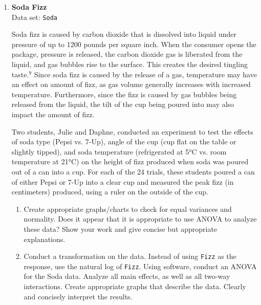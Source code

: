 \documentclass[
]{book}
\begin{document}
\begin{enumerate}
  \begin{enumerate}
    \item Make the assumption that ANOVA is appropriate for the data (i.e., do not transform any data). Using software, conduct an ANOVA for the data that will analyze all main effects, as well as all two-way interactions. Treat the six buildings as six levels of the \textit{Building} factor. Treat faucet, desk, and door as three levels of the \textit{Location} factor.
    \item Create appropriate graphs/charts to check for equal variances and normality. Does it appear that it is appropriate to use ANOVA to analyze these data?
    \item Transform the response to the natural log of \texttt{Count} and redo the analysis. How do the results change? Create appropriate graphs to display the main effects and the interaction effects. Describe how the academic buildings (ARH and Noyce) compare to the other buildings.
  \end{enumerate}

  \item \textbf{Soda Fizz}\\
  Data set: \texttt{Soda}

Soda fizz is caused by carbon dioxide that is dissolved into liquid under pressure of up to 1200 pounds per square inch. When the consumer opens the package, pressure is released, the carbon dioxide gas is liberated from the liquid, and gas bubbles rise to the surface. This creates the desired tingling taste.$^9$ Since soda fizz is caused by the release of a gas, temperature may have an effect on amount of fizz, as gas volume generally increases with increased temperature. Furthermore, since the fizz is caused by gas bubbles being released from the liquid, the tilt of the cup being poured into may also impact the amount of fizz.

Two students, Julie and Daphne, conducted an experiment to test the effects of soda type (Pepsi vs. 7-Up), angle of the cup (cup flat on the table or slightly tipped), and soda temperature (refrigerated at 5°C vs. room temperature at 21°C) on the height of fizz produced when soda was poured out of a can into a cup. For each of the 24 trials, these students poured a can of either Pepsi or 7-Up into a clear cup and measured the peak fizz (in centimeters) produced, using a ruler on the outside of the cup.

  \begin{enumerate}
    \item Create appropriate graphs/charts to check for equal variances and normality. Does it appear that it is appropriate to use ANOVA to analyze these data? Show your work and give concise but appropriate explanations.
    \item Conduct a transformation on the data. Instead of using \texttt{Fizz} as the response, use the natural log of \texttt{Fizz}. Using software, conduct an ANOVA for the Soda data. Analyze all main effects, as well as all two-way interactions. Create appropriate graphs that describe the data. Clearly and concisely interpret the results.
  \end{enumerate}


\end{enumerate}
\end{document}
